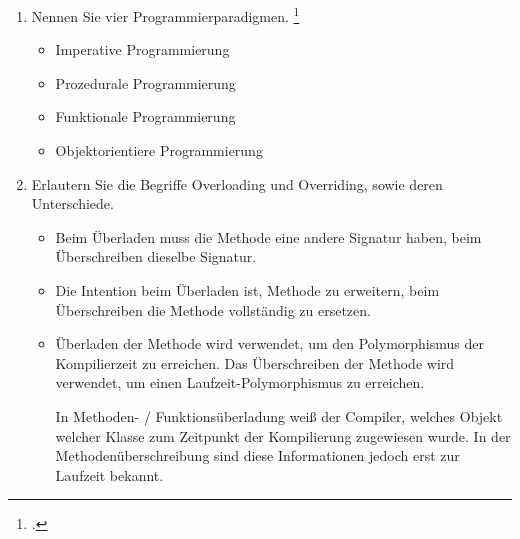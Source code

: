 \documentclass{bschlangaul-aufgabe}
\begin{document}

\begin{enumerate}


\item Nennen Sie vier Programmierparadigmen.
\footcite{examen:66116:2021:03}

\begin{bAntwort}
\begin{itemize}
\item Imperative Programmierung
\item Prozedurale Programmierung
\item Funktionale Programmierung
\item Objektorientiere Programmierung
\end{itemize}
\end{bAntwort}


\item Erlautern Sie die Begriffe Overloading und Overriding, sowie deren
Unterschiede.

\begin{bAntwort}
\begin{itemize}
\item Beim Überladen muss die Methode eine andere Signatur haben, beim
Überschreiben dieselbe Signatur.

\item Die Intention beim Überladen ist, Methode zu erweitern, beim
Überschreiben die Methode vollständig zu ersetzen.

\item Überladen der Methode wird verwendet, um den Polymorphismus der
Kompilierzeit zu erreichen. Das Überschreiben der Methode wird
verwendet, um einen Laufzeit-Polymorphismus zu erreichen.

In Methoden- / Funktionsüberladung weiß der Compiler, welches Objekt
welcher Klasse zum Zeitpunkt der Kompilierung zugewiesen wurde. In
der Methodenüberschreibung sind diese Informationen jedoch erst zur
Laufzeit bekannt.


\end{itemize}
\end{bAntwort}
\end{enumerate}
\end{document}
